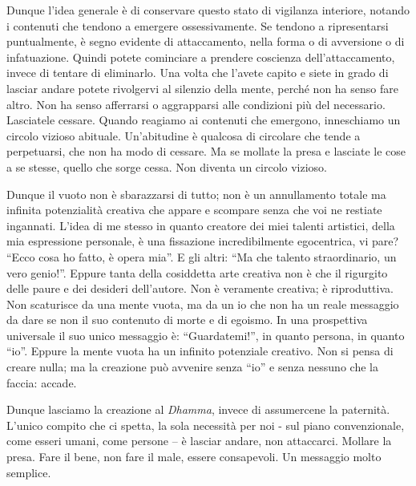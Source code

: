 Dunque l'idea generale è di conservare questo stato di vigilanza
interiore, notando i contenuti che tendono a emergere ossessivamente. Se
tendono a ripresentarsi puntualmente, è segno evidente di attaccamento,
nella forma o di avversione o di infatuazione. Quindi potete cominciare
a prendere coscienza dell'attaccamento, invece di tentare di eliminarlo.
Una volta che l'avete capito e siete in grado di lasciar andare potete
rivolgervi al silenzio della mente, perché non ha senso fare altro. Non
ha senso afferrarsi o aggrapparsi alle condizioni più del necessario.
Lasciatele cessare. Quando reagiamo ai contenuti che emergono,
inneschiamo un circolo vizioso abituale. Un'abitudine è qualcosa di
circolare che tende a perpetuarsi, che non ha modo di cessare. Ma se
mollate la presa e lasciate le cose a se stesse, quello che sorge cessa.
Non diventa un circolo vizioso.

Dunque il vuoto non è sbarazzarsi di tutto; non è un annullamento totale
ma infinita potenzialità creativa che appare e scompare senza che voi ne
restiate ingannati. L'idea di me stesso in quanto creatore dei miei
talenti artistici, della mia espressione personale, è una fissazione
incredibilmente egocentrica, vi pare? ``Ecco cosa ho fatto, è opera mia''.
E gli altri: ``Ma che talento straordinario, un vero genio!''. Eppure
tanta della cosiddetta arte creativa non è che il rigurgito delle paure
e dei desideri dell'autore. Non è veramente creativa; è riproduttiva.
Non scaturisce da una mente vuota, ma da un io che non ha un reale
messaggio da dare se non il suo contenuto di morte e di egoismo. In una
prospettiva universale il suo unico messaggio è: ``Guardatemi!'', in
quanto persona, in quanto ``io''. Eppure la mente vuota ha un infinito
potenziale creativo. Non si pensa di creare nulla; ma la creazione può
avvenire senza ``io'' e senza nessuno che la faccia: accade.

Dunque lasciamo la creazione al \textit{Dhamma}, invece di assumercene la
paternità. L'unico compito che ci spetta, la sola necessità per noi -
sul piano convenzionale, come esseri umani, come persone – è lasciar
andare, non attaccarci. Mollare la presa. Fare il bene, non fare il
male, essere consapevoli. Un messaggio molto semplice.

